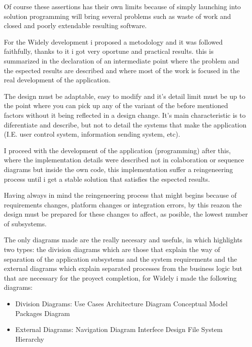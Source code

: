 Of course these assertions has their own limits because of simply launching into solution programming will bring several problems such as waste of work and closed and poorly extendable resulting software. \newline

For the Widely development i proposed a metodology and it was followed faithfully, thanks to it i got very oportune and practical results. this is summarized in the declaration of an intermediate point where the problem and the espected results are described and where most of the work is focused in the real development of the application.

The design must be adaptable, easy to modify and it's detail limit must be up to the point where you can pick up any of the variant of the before mentioned factors without it being reflected in a design change. It's main characteristic is to diferentiate and describe, but not to detail the systems that make the application (I.E. user control system, information sending system, etc). \newline

I proceed with the development of the application (programming) after this, where the implementation details were described not in colaboration or sequence diagrams but inside the own code, this implementation suffer a reingeneering process until i get a stable solution that satisfies the espected results.

Having always in mind the reingeneering process that might begins because of requirements changes, platform changes or integration errors, by this reazon the design must be prepared for these changes to affect, as posible, the lowest number of subsystems.

The only diagrams made are the really necesary and usefuls, in which highlights two types: the division diagrams which are those that explain the way of separation of the application subsystems and the system requirements and the external diagrams which explain separated processes from the business logic but that are necessary for the proyect completion, for Widely i made the following diagrams: \newline

\begin{itemize}
	
	\item Division Diagrams:
	\subitem Use Cases
	\subitem Architecture Diagram
	\subitem Conceptual Model
	\subitem Packages Diagram
	\newline
	
	\item External Diagrams:
	\subitem Navigation Diagram
	\subitem Interfece Design
	\subitem File System Hierarchy
	\newline
	
\end{itemize}

